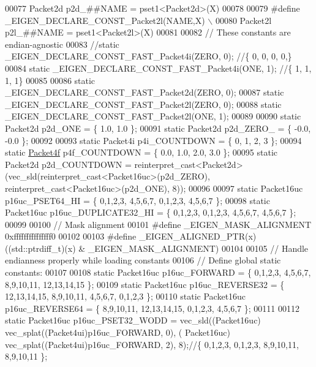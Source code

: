 \begin{DoxyCode}
00077 \textcolor{preprocessor}{  Packet2d p2d\_##NAME = pset1<Packet2d>(X)}
00078 
00079 \textcolor{preprocessor}{#define \_EIGEN\_DECLARE\_CONST\_Packet2l(NAME,X) \(\backslash\)}
00080 \textcolor{preprocessor}{  Packet2l p2l\_##NAME = pset1<Packet2l>(X)}
00081 
00082 \textcolor{comment}{// These constants are endian-agnostic}
00083 \textcolor{comment}{//static \_EIGEN\_DECLARE\_CONST\_FAST\_Packet4i(ZERO, 0); //\{ 0, 0, 0, 0,\}}
00084 \textcolor{keyword}{static} \_EIGEN\_DECLARE\_CONST\_FAST\_Packet4i(ONE, 1); \textcolor{comment}{//\{ 1, 1, 1, 1\}}
00085 
00086 \textcolor{keyword}{static} \_EIGEN\_DECLARE\_CONST\_FAST\_Packet2d(ZERO, 0);
00087 \textcolor{keyword}{static} \_EIGEN\_DECLARE\_CONST\_FAST\_Packet2l(ZERO, 0);
00088 \textcolor{keyword}{static} \_EIGEN\_DECLARE\_CONST\_FAST\_Packet2l(ONE, 1);
00089 
00090 \textcolor{keyword}{static} Packet2d p2d\_ONE = \{ 1.0, 1.0 \}; 
00091 \textcolor{keyword}{static} Packet2d p2d\_ZERO\_ = \{ -0.0, -0.0 \};
00092 
00093 \textcolor{keyword}{static} Packet4i p4i\_COUNTDOWN = \{ 0, 1, 2, 3 \};
00094 \textcolor{keyword}{static} \hyperlink{struct_eigen_1_1internal_1_1_packet4f}{Packet4f} p4f\_COUNTDOWN = \{ 0.0, 1.0, 2.0, 3.0 \};
00095 \textcolor{keyword}{static} Packet2d p2d\_COUNTDOWN = \textcolor{keyword}{reinterpret\_cast<}Packet2d\textcolor{keyword}{>}(vec\_sld(reinterpret\_cast<Packet16uc>(p2d\_ZERO), 
      reinterpret\_cast<Packet16uc>(p2d\_ONE), 8));
00096 
00097 \textcolor{keyword}{static} Packet16uc p16uc\_PSET64\_HI = \{ 0,1,2,3, 4,5,6,7, 0,1,2,3, 4,5,6,7 \};
00098 \textcolor{keyword}{static} Packet16uc p16uc\_DUPLICATE32\_HI = \{ 0,1,2,3, 0,1,2,3, 4,5,6,7, 4,5,6,7 \};
00099 
00100 \textcolor{comment}{// Mask alignment}
00101 \textcolor{preprocessor}{#define \_EIGEN\_MASK\_ALIGNMENT   0xfffffffffffffff0}
00102 
00103 \textcolor{preprocessor}{#define \_EIGEN\_ALIGNED\_PTR(x)   ((std::ptrdiff\_t)(x) & \_EIGEN\_MASK\_ALIGNMENT)}
00104 
00105 \textcolor{comment}{// Handle endianness properly while loading constants}
00106 \textcolor{comment}{// Define global static constants:}
00107 
00108 \textcolor{keyword}{static} Packet16uc p16uc\_FORWARD =   \{ 0,1,2,3, 4,5,6,7, 8,9,10,11, 12,13,14,15 \};
00109 \textcolor{keyword}{static} Packet16uc p16uc\_REVERSE32 = \{ 12,13,14,15, 8,9,10,11, 4,5,6,7, 0,1,2,3 \};
00110 \textcolor{keyword}{static} Packet16uc p16uc\_REVERSE64 = \{ 8,9,10,11, 12,13,14,15, 0,1,2,3, 4,5,6,7 \};
00111 
00112 \textcolor{keyword}{static} Packet16uc p16uc\_PSET32\_WODD   = vec\_sld((Packet16uc) vec\_splat((Packet4ui)p16uc\_FORWARD, 0), (
      Packet16uc) vec\_splat((Packet4ui)p16uc\_FORWARD, 2), 8);\textcolor{comment}{//\{ 0,1,2,3, 0,1,2,3, 8,9,10,11, 8,9,10,11 \};}

\end{DoxyCode}
